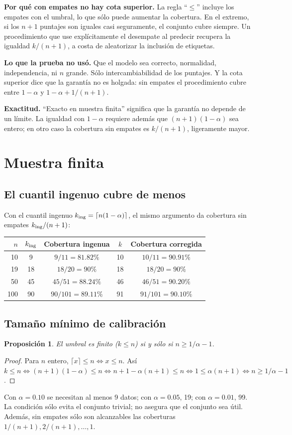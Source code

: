 \documentclass[11pt]{article}
\theoremstyle{plain}
\newtheorem{proposicion}[teorema]{Proposición}
\theoremstyle{definition}
\theoremstyle{remark}
\newcommand{\dest}[1]{\par\needspace{4\baselineskip}\textbf{#1}\quad}
\begin{document}
\dest{Por qué con empates no hay cota superior.} La regla ``$\le$'' incluye los empates con el
umbral, lo que sólo puede aumentar la cobertura. En el extremo, si los $n+1$ puntajes son iguales
casi seguramente, el conjunto cubre siempre. Un procedimiento que use explícitamente el desempate al
predecir recupera la igualdad $k/(n+1)$, a costa de aleatorizar la inclusión de etiquetas.

\dest{Lo que la prueba no usó.} Que el modelo sea correcto, normalidad, independencia, ni $n$ grande.
Sólo intercambiabilidad de los puntajes. Y la cota superior dice que la garantía no es holgada: sin
empates el procedimiento cubre entre $1-\alpha$ y $1-\alpha+1/(n+1)$.

\dest{Exactitud.} ``Exacto en muestra finita'' significa que la garantía no depende de un límite.
La igualdad con $1-\alpha$ requiere además que $(n+1)(1-\alpha)$ sea entero; en otro caso la
cobertura sin empates es $k/(n+1)$, ligeramente mayor.

\section{Muestra finita}\label{sec:finita}
\subsection{El cuantil ingenuo cubre de menos}
Con el cuantil ingenuo $k_{\rm ing}=\lceil n(1-\alpha)\rceil$, el mismo argumento da cobertura sin
empates $k_{\rm ing}/(n+1)$:
\begin{center}
\begin{tabular}{rcccc}
\toprule
$n$ & $k_{\rm ing}$ & Cobertura ingenua & $k$ & Cobertura corregida\\
\midrule
10&9&$9/11=81.82\%$&10&$10/11=90.91\%$\\
19&18&$18/20=90\%$&18&$18/20=90\%$\\
50&45&$45/51=88.24\%$&46&$46/51=90.20\%$\\
100&90&$90/101=89.11\%$&91&$91/101=90.10\%$\\
\bottomrule
\end{tabular}
\end{center}

\subsection{Tamaño mínimo de calibración}
\begin{proposicion}
El umbral es finito ($k\le n$) si y sólo si $n\ge1/\alpha-1$.
\end{proposicion}
\begin{proof}
Para $n$ entero, $\lceil x\rceil\le n\iff x\le n$. Así $k\le n\iff(n+1)(1-\alpha)\le n\iff
n+1-\alpha(n+1)\le n\iff1\le\alpha(n+1)\iff n\ge1/\alpha-1$.
\end{proof}
Con $\alpha=0.10$ se necesitan al menos 9 datos; con $\alpha=0.05$, 19; con $\alpha=0.01$, 99. La
condición sólo evita el conjunto trivial; no asegura que el conjunto sea útil. Además, sin empates
sólo son alcanzables las coberturas $1/(n+1),2/(n+1),\dots,1$.
\end{document}
